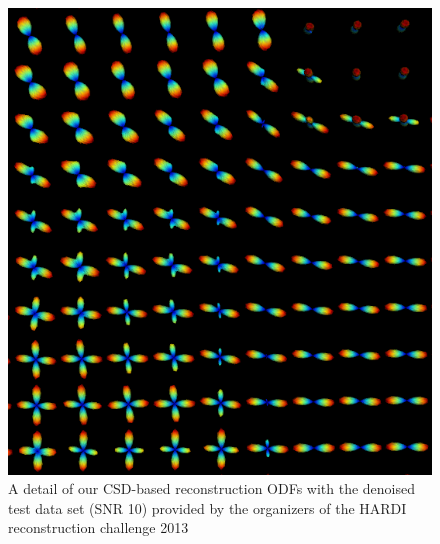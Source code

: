 \documentclass[9pt,conference,a4paper]{IEEEtran}
\begin{document}
\begin{figure}[h]
\begin{centering}
\includegraphics[scale=1.]{csd_test_snr10}
\end{centering}
\caption{A detail of our CSD-based reconstruction ODFs with the denoised test data set (SNR 10) provided by the organizers of the HARDI reconstruction challenge 2013}
\end{figure}
\end{document}
